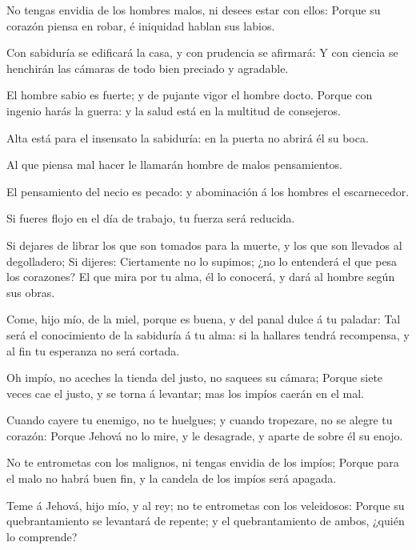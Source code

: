  No tengas envidia de los hombres malos, ni desees estar con
ellos:  Porque su corazón piensa en robar, é iniquidad
hablan sus labios.

 Con sabiduría se edificará la casa, y con prudencia se
afirmará:  Y con ciencia se henchirán las cámaras de todo
bien preciado y agradable.

 El hombre sabio es fuerte; y de pujante vigor el hombre
docto.  Porque con ingenio harás la guerra: y la salud está
en la multitud de consejeros.

 Alta está para el insensato la sabiduría: en la puerta no
abrirá él su boca.

 Al que piensa mal hacer le llamarán hombre de malos
pensamientos.

 El pensamiento del necio es pecado: y abominación á los
hombres el escarnecedor.

 Si fueres flojo en el día de trabajo, tu fuerza será
reducida.

 Si dejares de librar los que son tomados para la muerte, y
los que son llevados al degolladero;  Si dijeres:
Ciertamente no lo supimos; ¿no lo entenderá el que pesa los corazones?
El que mira por tu alma, él lo conocerá, y dará al hombre según sus
obras.

 Come, hijo mío, de la miel, porque es buena, y del panal
dulce á tu paladar:  Tal será el conocimiento de la
sabiduría á tu alma: si la hallares tendrá recompensa, y al fin tu
esperanza no será cortada.

 Oh impío, no aceches la tienda del justo, no saquees su
cámara;  Porque siete veces cae el justo, y se torna á
levantar; mas los impíos caerán en el mal.

 Cuando cayere tu enemigo, no te huelgues; y cuando
tropezare, no se alegre tu corazón:  Porque Jehová no lo
mire, y le desagrade, y aparte de sobre él su enojo.

 No te entrometas con los malignos, ni tengas envidia de
los impíos;  Porque para el malo no habrá buen fin, y la
candela de los impíos será apagada.

 Teme á Jehová, hijo mío, y al rey; no te entrometas con
los veleidosos:  Porque su quebrantamiento se levantará de
repente; y el quebrantamiento de ambos, ¿quién lo comprende?

